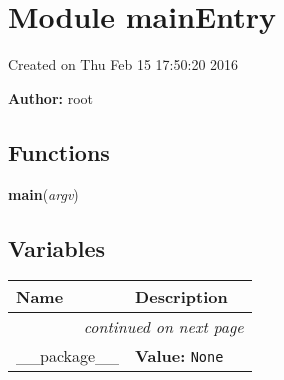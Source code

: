 %
%
%


\section{Module mainEntry}

    \label{mainEntry}
Created on Thu Feb 15 17:50:20 2016

\textbf{Author:} root





  \subsection{Functions}

    \label{mainEntry:main}

    \vspace{0.5ex}

\hspace{.8\funcindent}\begin{boxedminipage}{\funcwidth}

    \raggedright \textbf{main}(\textit{argv})

\setlength{\parskip}{2ex}
\setlength{\parskip}{1ex}
    \end{boxedminipage}



  \subsection{Variables}

    \vspace{-1cm}
\hspace{\varindent}\begin{longtable}{|p{\varnamewidth}|p{\vardescrwidth}|l}
\cline{1-2}
\cline{1-2} \centering \textbf{Name} & \centering \textbf{Description}& \\
\cline{1-2}
\endhead\cline{1-2}\multicolumn{3}{r}{\small\textit{continued on next page}}\\\endfoot\cline{1-2}
\endlastfoot\raggedright \_\-\_\-p\-a\-c\-k\-a\-g\-e\-\_\-\_\- & \raggedright \textbf{Value:} 
{\tt None}&\\
\cline{1-2}
\end{longtable}


